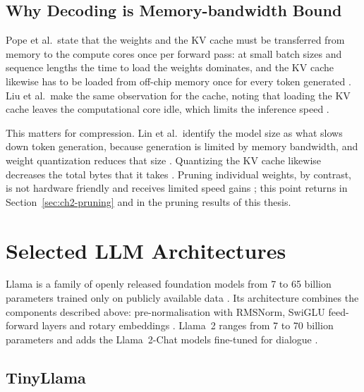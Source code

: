 \subsection{Why Decoding is Memory-bandwidth Bound}
\label{sec:ch2-roofline}

Pope et al.\ state that the weights and the KV cache must be transferred from memory to the compute cores once per forward pass: at small batch sizes and sequence lengths the time to load the weights dominates, and the KV cache likewise has to be loaded from off-chip memory once for every token generated \cite{pope2023efficiently}. Liu et al.\ make the same observation for the cache, noting that loading the KV cache leaves the computational core idle, which limits the inference speed \cite{liu2024kivi}.

This matters for compression. Lin et al.\ identify the model size as what slows down token generation, because generation is limited by memory bandwidth, and weight quantization reduces that size \cite{lin2024awq}. Quantizing the KV cache likewise decreases the total bytes that it takes \cite{liu2024kivi}. Pruning individual weights, by contrast, is not hardware friendly and receives limited speed gains \cite{zhou2021nm}; this point returns in Section~\ref{sec:ch2-pruning} and in the pruning results of this thesis.

\section{Selected LLM Architectures}
\label{sec:ch2-archs}

Llama is a family of openly released foundation models from 7 to 65 billion parameters trained only on publicly available data \cite{touvron2023llama}. Its architecture combines the components described above: pre-normalisation with RMSNorm, SwiGLU feed-forward layers and rotary embeddings \cite{touvron2023llama}. Llama~2 ranges from 7 to 70 billion parameters and adds the Llama~2-Chat models fine-tuned for dialogue \cite{touvron2023llama2}.

\subsection{TinyLlama}
\label{sec:ch2-tinyllama}


